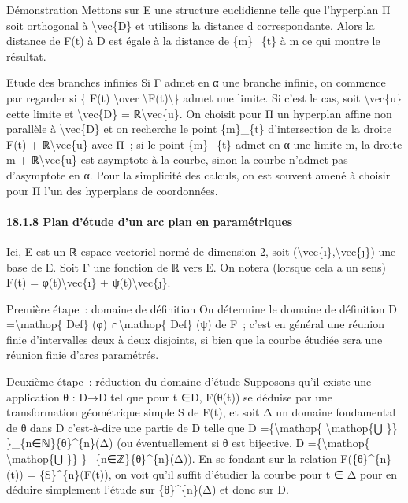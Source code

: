\documentclass[]{article}
\begin{document}
Démonstration Mettons sur E une structure euclidienne telle que
l'hyperplan Π soit orthogonal à \textbackslash{}vec\{D\} et utilisons la
distance d correspondante. Alors la distance de F(t) à D est égale à la
distance de \{m\}\_\{t\} à m ce qui montre le résultat.

Etude des branches infinies Si Γ admet en α une branche infinie, on
commence par regarder si \{ F(t) \textbackslash{}over
\textbackslash{}\textbar{}F(t)\textbackslash{}\textbar{}\} admet une
limite. Si c'est le cas, soit \textbackslash{}vec\{u\} cette limite et
\textbackslash{}vec\{D\} = ℝ\textbackslash{}vec\{u\}. On choisit pour Π
un hyperplan affine non parallèle à \textbackslash{}vec\{D\} et on
recherche le point \{m\}\_\{t\} d'intersection de la droite F(t) +
ℝ\textbackslash{}vec\{u\} avec Π~; si le point \{m\}\_\{t\} admet en α
une limite m, la droite m + ℝ\textbackslash{}vec\{u\} est asymptote à la
courbe, sinon la courbe n'admet pas d'asymptote en α. Pour la simplicité
des calculs, on est souvent amené à choisir pour Π l'un des hyperplans
de coordonnées.

\paragraph{18.1.8 Plan d'étude d'un arc plan en paramétriques}

Ici, E est un ℝ espace vectoriel normé de dimension 2, soit
(\textbackslash{}vec\{ı\},\textbackslash{}vec\{ȷ\}) une base de E. Soit
F une fonction de ℝ vers E. On notera (lorsque cela a un sens) F(t) =
φ(t)\textbackslash{}vec\{ı\} + ψ(t)\textbackslash{}vec\{ȷ\}.

Première étape~: domaine de définition On détermine le domaine de
définition D =\textbackslash{}mathop\{ Def\} (φ)
∩\textbackslash{}mathop\{ Def\} (ψ) de F~; c'est en général une réunion
finie d'intervalles deux à deux disjoints, si bien que la courbe étudiée
sera une réunion finie d'arcs paramétrés.

Deuxième étape~: réduction du domaine d'étude Supposons qu'il existe une
application θ : D→D tel que pour t ∈D, F(θ(t)) se déduise par une
transformation géométrique simple S de F(t), et soit Δ un domaine
fondamental de θ dans D c'est-à-dire une partie de D telle que D
=\{\textbackslash{}mathop\{ \textbackslash{}mathop\{⋃ \}\}
\}\_\{n∈ℕ\}\{θ\}\^{}\{n\}(Δ) (ou éventuellement si θ est bijective, D
=\{\textbackslash{}mathop\{ \textbackslash{}mathop\{⋃ \}\}
\}\_\{n∈ℤ\}\{θ\}\^{}\{n\}(Δ)). En se fondant sur la relation
F(\{θ\}\^{}\{n\}(t)) = \{S\}\^{}\{n\}(F(t)), on voit qu'il suffit
d'étudier la courbe pour t ∈ Δ pour en déduire simplement l'étude sur
\{θ\}\^{}\{n\}(Δ) et donc sur D.
\end{document}
